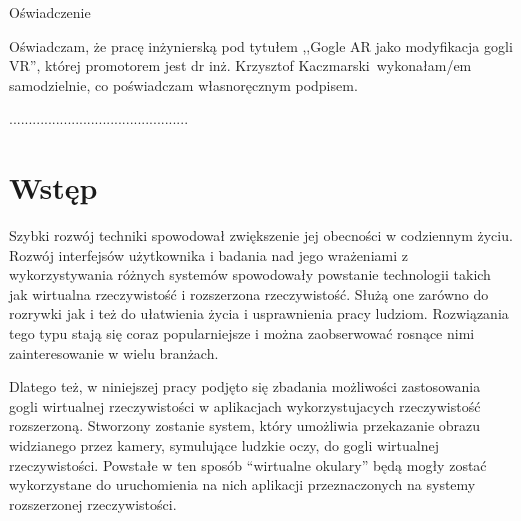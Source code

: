 \documentclass[a4paper,11pt,twoside]{report}
\theoremstyle{definition}
\newcommand{\tytul}{Gogle AR jako modyfikacja gogli VR}
\renewcommand{\title}{AR googles as modified VR googles}
\newcommand{\type}{inżyniers} %
\newcommand{\supervisor}{dr inż. Krzysztof Kaczmarski}
\begin{document}
\begin{center}
Oświadczenie %
\end{center}

\indent Oświadczam, że pracę \type ką pod
tytułem ,,\tytul '', której promotorem jest \supervisor \ wykonałam/em
samodzielnie, co poświadczam własnoręcznym podpisem.
\vspace{2cm}



\begin{flushright}
  \begin{minipage}{50mm}
    \begin{center}
      ..............................................

    \end{center}
  \end{minipage}
\end{flushright}

\thispagestyle{empty}
\newpage

\null\thispagestyle{empty}\newpage

\tableofcontents
\thispagestyle{empty}
\newpage
\null\thispagestyle{empty}\newpage
\setcounter{page}{11}
\pagestyle{fancy}


\chapter*{Wstęp} %

Szybki rozwój techniki spowodował zwiększenie jej obecności w codziennym życiu. Rozwój interfejsów użytkownika i badania nad jego wrażeniami z wykorzystywania różnych systemów spowodowały powstanie technologii takich jak wirtualna rzeczywistość i rozszerzona rzeczywistość. Służą one zarówno do rozrywki jak i też do ułatwienia życia i usprawnienia pracy ludziom. Rozwiązania tego typu stają się coraz popularniejsze i można zaobserwować rosnące nimi zainteresowanie w wielu branżach.

Dlatego też, w niniejszej pracy podjęto się zbadania możliwości zastosowania gogli wirtualnej rzeczywistości w aplikacjach wykorzystujacych rzeczywistość rozszerzoną. Stworzony zostanie system, który umożliwia przekazanie obrazu widzianego przez kamery, symulujące ludzkie oczy, do gogli wirtualnej rzeczywistości. Powstałe w ten sposób ``wirtualne okulary'' będą mogły zostać wykorzystane do uruchomienia na nich aplikacji przeznaczonych na systemy rozszerzonej rzeczywistości.
\end{document}
